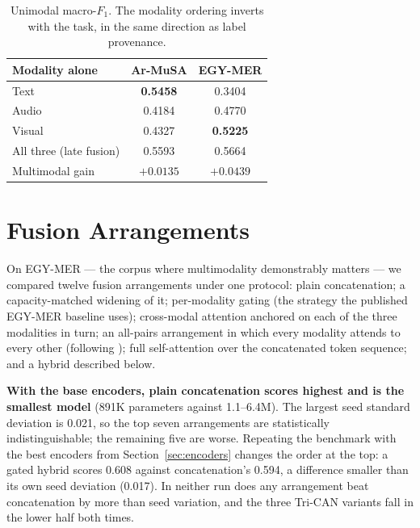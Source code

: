 \documentclass[12pt, a4paper]{article}
\begin{document}
\begin{table}[h]
\centering
\begin{tabular}{lcc}
\toprule
\textbf{Modality alone} & \textbf{Ar-MuSA} & \textbf{EGY-MER} \\
\midrule
Text   & \textbf{0.5458} & 0.3404 \\
Audio  & 0.4184 & 0.4770 \\
Visual & 0.4327 & \textbf{0.5225} \\
\midrule
All three (late fusion) & 0.5593 & 0.5664 \\
Multimodal gain & $+0.0135$ & $\mathbf{+0.0439}$ \\
\bottomrule
\end{tabular}
\caption{Unimodal macro-$F_1$. The modality ordering inverts with the task, in
the same direction as label provenance.}
\label{tab:unimodal}
\end{table}

\section{Fusion Arrangements}
\label{sec:fusion}

On EGY-MER --- the corpus where multimodality demonstrably matters --- we
compared twelve fusion arrangements under one protocol: plain concatenation; a
capacity-matched widening of it; per-modality gating (the strategy the published
EGY-MER baseline uses); cross-modal attention anchored on each of the three
modalities in turn; an all-pairs arrangement in which every modality attends to
every other (following \citealp{Tsai2019}); full self-attention over the
concatenated token sequence; and a hybrid described below.

\textbf{With the base encoders, plain concatenation scores highest and is the
smallest model} (891K parameters against 1.1--6.4M). The largest seed standard
deviation is 0.021, so the top seven arrangements are statistically
indistinguishable; the remaining five are worse. Repeating the benchmark with the
best encoders from Section~\ref{sec:encoders} changes the order at the top: a
gated hybrid scores 0.608 against concatenation's 0.594, a difference smaller than
its own seed deviation (0.017). In neither run does any arrangement beat
concatenation by more than seed variation, and the three Tri-CAN variants fall in
the lower half both times.
\end{document}
